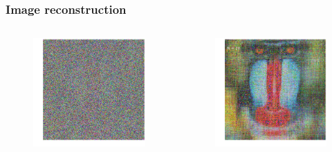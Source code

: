 \documentclass[xcolor={dvipsnames}]{beamer}
\begin{document}
\begin{frame}
\frametitle{Image reconstruction}
\begin{columns}
\hspace{-0.25in}
\begin{figure}
\includegraphics[width=\textwidth]{figs/noise-mandrill.png}
\end{figure}
\begin{figure}
\includegraphics[width=\textwidth]{figs/noise-mandrill-20.png}
\end{figure}
\end{columns}
\end{frame}
\end{document}
